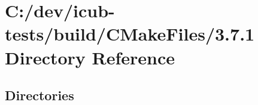 \section{C\+:/dev/icub-\/tests/build/\+C\+Make\+Files/3.7.1 Directory Reference}
\label{dir_4b1d140cb9a430ba11cb2346253f0226}
\subsection*{Directories}
\begin{DoxyCompactItemize}
\end{DoxyCompactItemize}
